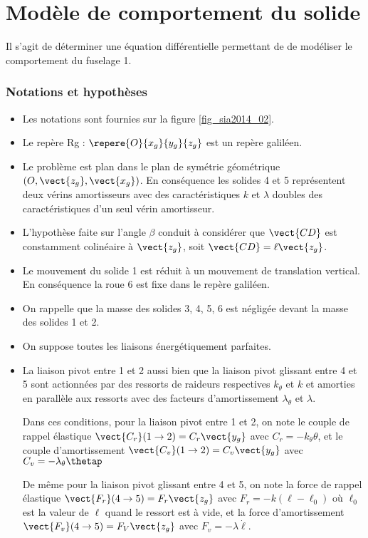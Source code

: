 \section{Modèle de comportement du solide}
\begin{obj}
Il s'agit de déterminer une équation différentielle permettant de de modéliser le comportement du fuselage 1.
\end{obj}

\subsubsection*{Notations et hypothèses}
\begin{itemize}
\item Les notations sont fournies sur la figure \ref{fig_sia2014_02}. 
\item Le repère Rg : $\repere{O}{x_g}{y_g}{z_g}$ est un repère galiléen. 
\item Le problème est plan dans le plan de symétrie géométrique $\left(O,\vect{z_g},\vect{x_g}\right)$. En conséquence les solides 4 et 5
représentent deux vérins amortisseurs avec des caractéristiques $k$ et $\lambda$ doubles des caractéristiques d'un seul 
vérin amortisseur. 

\item L'hypothèse faite sur l'angle $\beta$ conduit à considérer que $\vect{CD}$ est constamment colinéaire à $\vect{z_g}$, soit 
$\vect{CD} = \ell \vect{z_g}$. 

\item Le mouvement du solide 1 est réduit à un mouvement de translation vertical. En conséquence la roue 6 est 
fixe dans le repère galiléen. 

\item On rappelle que la masse des solides 3, 4, 5, 6 est négligée devant la masse des solides 1 et 2. 

\item On suppose toutes les liaisons énergétiquement parfaites. 

\item La liaison pivot entre 1 et 2 aussi bien que la liaison pivot glissant entre 4 et 5 sont actionnées par des ressorts 
de raideurs respectives $k_{\theta}$ et $k$ et amorties en parallèle aux ressorts avec des facteurs d'amortissement $\lambda_{\theta}$ et $\lambda$. 

Dans ces conditions, pour la liaison pivot entre 1 et 2, on note le couple de rappel élastique $\vect{C_r}(1\rightarrow 2) = C_r \vect{y_g}$ avec $C_r =-k_{\theta} \theta$, et le couple d'amortissement $\vect{C_v}(1\rightarrow 2) = C_v \vect{y_g}$ avec $C_v= -\lambda_{\theta} \thetap$

De même pour la liaison pivot glissant entre 4 et 5, on note la force de rappel élastique $\vect{F_r}(4\rightarrow 5) = F_r \vect{z_g}$ avec 
$F_r = -k \left( \ell - \ell_0\right)$ où $\ell_0$ est la valeur de $\ell$ quand le ressort est à vide, et la force d'amortissement $\vect{F_v}(4\rightarrow 5) = F_V \vect{z_g}$ avec $F_v = -\lambda\dot{\ell}$.

\end{itemize}

